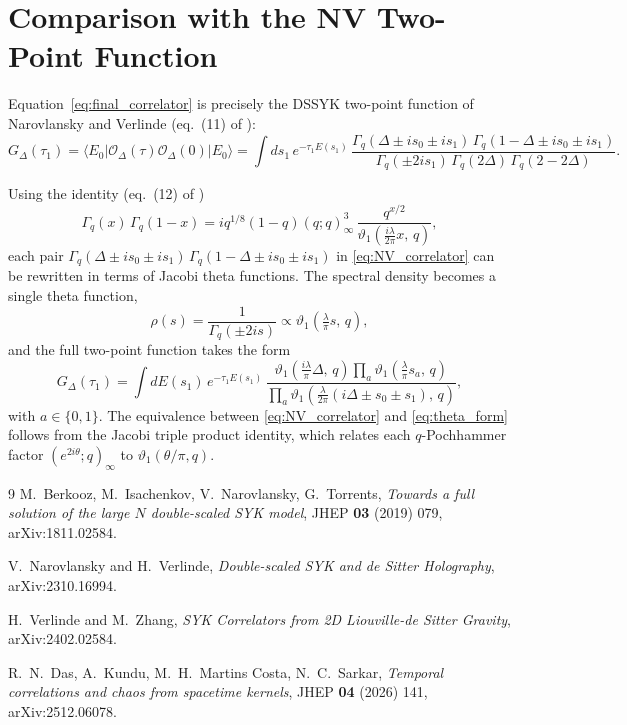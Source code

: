 \documentclass[12pt]{article}
\begin{document}
\section{Comparison with the NV Two-Point Function}

Equation~\eqref{eq:final_correlator} is precisely the DSSYK two-point function
of Narovlansky and Verlinde \cite{Narovlansky2023} (eq.~(11) of \cite{Verlinde2024}):
\begin{equation}
    G_\Delta(\tau_1)
    = \langle E_0|\mathcal{O}_\Delta(\tau)\mathcal{O}_\Delta(0)|E_0\rangle
    = \int ds_1\,e^{-\tau_1 E(s_1)}\,
      \frac{\Gamma_q(\Delta\pm is_0\pm is_1)\,\Gamma_q(1-\Delta\pm is_0\pm is_1)}
           {\Gamma_q(\pm 2is_1)\,\Gamma_q(2\Delta)\,\Gamma_q(2-2\Delta)}.
    \label{eq:NV_correlator}
\end{equation}

Using the identity (eq.~(12) of \cite{Verlinde2024})
\begin{equation}
    \Gamma_q(x)\,\Gamma_q(1-x)
    = iq^{1/8}(1-q)(q;q)^3_\infty\,\frac{q^{x/2}}{\vartheta_1\!\left(\tfrac{i\lambda}{2\pi}x,\,q\right)},
    \label{eq:Gamma_theta_identity}
\end{equation}
each pair $\Gamma_q(\Delta\pm is_0\pm is_1)\,\Gamma_q(1-\Delta\pm is_0\pm is_1)$
in \eqref{eq:NV_correlator} can be rewritten in terms of Jacobi theta functions.
The spectral density becomes a single theta function,
\begin{equation}
    \rho(s) = \frac{1}{\Gamma_q(\pm 2is)} \propto \vartheta_1\!\left(\tfrac{\lambda}{\pi}s,\,q\right),
\end{equation}
and the full two-point function takes the form
\begin{equation}
    G_\Delta(\tau_1)
    = \int dE(s_1)\,e^{-\tau_1 E(s_1)}\,
      \frac{\vartheta_1\!\left(\tfrac{i\lambda}{\pi}\Delta,\,q\right)
            \prod_a \vartheta_1\!\left(\tfrac{\lambda}{\pi}s_a,\,q\right)}
           {\prod_a \vartheta_1\!\left(\tfrac{\lambda}{2\pi}(i\Delta\pm s_0\pm s_1),\,q\right)},
    \label{eq:theta_form}
\end{equation}
with $a\in\{0,1\}$. The equivalence between \eqref{eq:NV_correlator} and \eqref{eq:theta_form}
follows from the Jacobi triple product identity, which relates each $q$-Pochhammer factor
$(e^{2i\theta};q)_\infty$ to $\vartheta_1(\theta/\pi,q)$.



\begin{thebibliography}{9}
M.~Berkooz, M.~Isachenkov, V.~Narovlansky, G.~Torrents,
\emph{Towards a full solution of the large $N$ double-scaled SYK model},
JHEP \textbf{03} (2019) 079, arXiv:1811.02584.

V.~Narovlansky and H.~Verlinde,
\emph{Double-scaled SYK and de Sitter Holography},
arXiv:2310.16994.

H.~Verlinde and M.~Zhang,
\emph{SYK Correlators from 2D Liouville-de Sitter Gravity},
arXiv:2402.02584.

R.~N.~Das, A.~Kundu, M.~H.~Martins Costa, N.~C.~Sarkar,
\emph{Temporal correlations and chaos from spacetime kernels},
JHEP \textbf{04} (2026) 141, arXiv:2512.06078.
\end{thebibliography}
\end{document}
